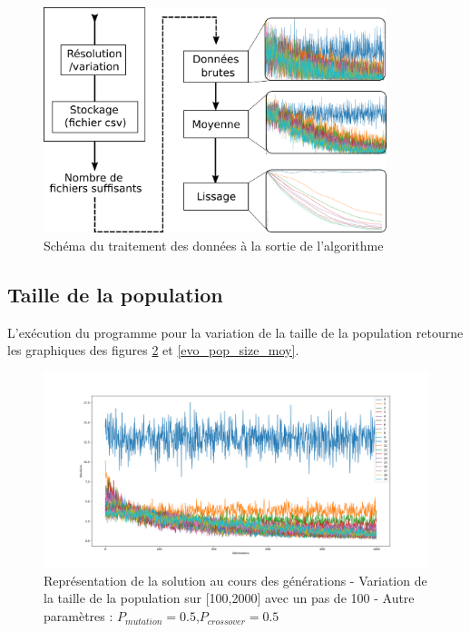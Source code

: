 \documentclass[12pt]{report}
\begin{document}
          \begin{figure}[!]
            \centering
            \includegraphics[width=10cm]{img/logigramme.png}
            \caption{Schéma du traitement des données à la sortie de l'algorithme}
            \label{logi}
          \end{figure}


      \subsection{Taille de la population}
        L'exécution du programme pour la variation de la taille de la population retourne les graphiques des figures \ref{evo_pop_size_brut} et \ref{evo_pop_size_moy}.

        \begin{figure}[h]
          \centering
          \includegraphics[width=18cm]{img/evo_pop_size_brut.png}
          \caption{Représentation de la solution au cours des générations - Variation de la taille de la population sur [100,2000] avec un pas de 100 - Autre paramètres : $P_{mutation} = 0.5$,$P_{crossover} = 0.5$}
          \label{evo_pop_size_brut}
        \end{figure}
\end{document}
